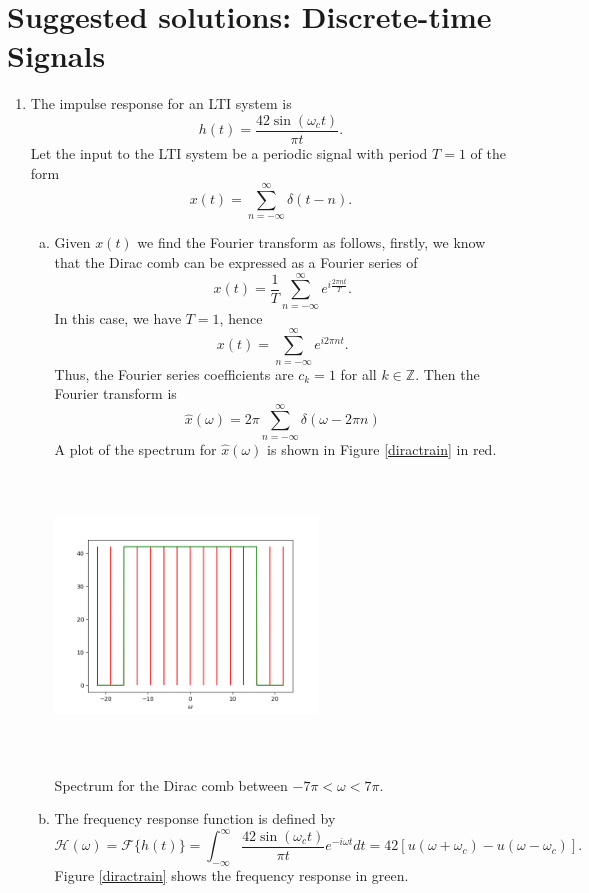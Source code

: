 \newpage
\section{Suggested solutions: Discrete-time Signals}
\begin{enumerate}
\item The impulse response for an LTI system is 
$$h(t)=\frac{42\sin(\omega_{c}t)}{\pi t}.$$
Let the input to the LTI system be a periodic signal with period $T=1$ of the form
$$x(t)=\sum_{n=-\infty}^{\infty}\delta(t-n).$$

\begin{enumerate}[a)]
\item Given $x(t)$ we find the Fourier transform as follows, firstly, we know that the Dirac comb can be expressed as a Fourier series of 
$$x(t)=\frac{1}{T}\sum_{n=-\infty}^{\infty}e^{i\frac{2\pi nt}{T}}.$$
In this case, we have $T=1$, hence
$$x(t)=\sum_{n=-\infty}^{\infty}e^{i2\pi nt}.$$
Thus, the Fourier series coefficients are $c_{k}=1$ for all $k\in\mathbb{Z}$. Then the Fourier transform is
$$\hat{x}(\omega)=2\pi\sum_{n=-\infty}^{\infty}\delta(\omega-2\pi n)$$
A plot of the spectrum for $\hat{x}(\omega)$ is shown in Figure \ref{diractrain} in red.

\begin{marginfigure}[1cm]
    \includegraphics[height=7.5cm,width=7.0cm]{ch10/figures/diractrain.png}
    \caption{Spectrum for the Dirac comb between $-7\pi<\omega<7\pi$.}
    \label{diractrain}
\end{marginfigure}

\item The frequency response function is defined by
$$\mathcal{H}(\omega)=\mathcal{F}\{h(t)\}=\int_{-\infty}^{\infty}\frac{42\sin(\omega_{c}t)}{\pi t}e^{-i\omega t}dt=42[u(\omega+\omega_{c})-u(\omega-\omega_{c})].$$
Figure \ref{diractrain} shows the frequency response in green.



\end{enumerate}
\end{enumerate}
